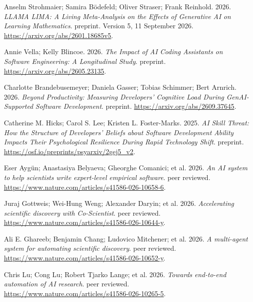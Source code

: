 {\begin{description}[leftmargin=2em,labelwidth=1.5em,itemsep=1pt,parsep=0pt]
\item[66.] \hypertarget{ref-llamalima2026}{} Anselm Strohmaier; Samira Bödefeld; Oliver Straser; Frank Reinhold. 2026. \textit{LLAMA LIMA: A Living Meta-Analysis on the Effects of Generative AI on Learning Mathematics}. preprint. Version 5, 11 September 2026. \url{https://arxiv.org/abs/2601.18685v5}.

\item[67.] \hypertarget{ref-vella2026}{} Annie Vella; Kelly Blincoe. 2026. \textit{The Impact of AI Coding Assistants on Software Engineering: A Longitudinal Study}. preprint. \url{https://arxiv.org/abs/2605.23135}.

\item[68.] \hypertarget{ref-brand2026}{} Charlotte Brandebusemeyer; Daniela Gasser; Tobias Schimmer; Bert Arnrich. 2026. \textit{Beyond Productivity: Measuring Developers' Cognitive Load During GenAI-Supported Software Development}. preprint. \url{https://arxiv.org/abs/2609.37645}.

\item[69.] \hypertarget{ref-ref-47ac0a3015}{} Catherine M. Hicks; Carol S. Lee; Kristen L. Foster-Marks. 2025. \textit{AI Skill Threat: How the Structure of Developers' Beliefs about Software Development Ability Impacts Their Psychological Resilience During Rapid Technology Shift}. preprint. \url{https://osf.io/preprints/psyarxiv/2gej5\_v2}.

\item[70.] \hypertarget{ref-era2026}{} Eser Aygün; Anastasiya Belyaeva; Gheorghe Comanici; et al. 2026. \textit{An AI system to help scientists write expert-level empirical software}. peer reviewed. \url{https://www.nature.com/articles/s41586-026-10658-6}.

\item[71.] \hypertarget{ref-coscientist2026}{} Juraj Gottweis; Wei-Hung Weng; Alexander Daryin; et al. 2026. \textit{Accelerating scientific discovery with Co-Scientist}. peer reviewed. \url{https://www.nature.com/articles/s41586-026-10644-y}.

\item[72.] \hypertarget{ref-robin2026}{} Ali E. Ghareeb; Benjamin Chang; Ludovico Mitchener; et al. 2026. \textit{A multi-agent system for automating scientific discovery}. peer reviewed. \url{https://www.nature.com/articles/s41586-026-10652-y}.

\item[73.] \hypertarget{ref-aiscientist2026}{} Chris Lu; Cong Lu; Robert Tjarko Lange; et al. 2026. \textit{Towards end-to-end automation of AI research}. peer reviewed. \url{https://www.nature.com/articles/s41586-026-10265-5}.


\end{description}}

